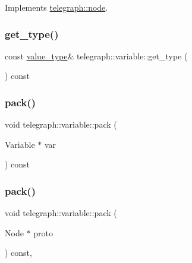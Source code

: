Implements \hyperlink{classtelegraph_1_1node_a68c4aed1434da1f0ece9089ff99ffcdb}{telegraph\+::node}.

\mbox{\label{classtelegraph_1_1variable_aa3df360c10cfa96a374374beaefbac2e}} 
\subsubsection{\texorpdfstring{get\+\_\+type()}{get\_type()}}
{\footnotesize\ttfamily const \hyperlink{classtelegraph_1_1value__type}{value\+\_\+type}\& telegraph\+::variable\+::get\+\_\+type (\begin{DoxyParamCaption}{ }\end{DoxyParamCaption}) const\hspace{0.3cm}{\ttfamily [inline]}}

\mbox{\label{classtelegraph_1_1variable_a436e5ea79ef18757d58a65caeb795be6}} 
\subsubsection{\texorpdfstring{pack()}{pack()}\hspace{0.1cm}{\footnotesize\ttfamily [1/2]}}
{\footnotesize\ttfamily void telegraph\+::variable\+::pack (\begin{DoxyParamCaption}\item[{Variable $\ast$}]{var }\end{DoxyParamCaption}) const}

\mbox{\label{classtelegraph_1_1variable_a3016d192f7d4328cf1f32273f9431d83}} 
\subsubsection{\texorpdfstring{pack()}{pack()}\hspace{0.1cm}{\footnotesize\ttfamily [2/2]}}
{\footnotesize\ttfamily void telegraph\+::variable\+::pack (\begin{DoxyParamCaption}\item[{Node $\ast$}]{proto }\end{DoxyParamCaption}) const\hspace{0.3cm}{\ttfamily [override]}, {\ttfamily [virtual]}}



